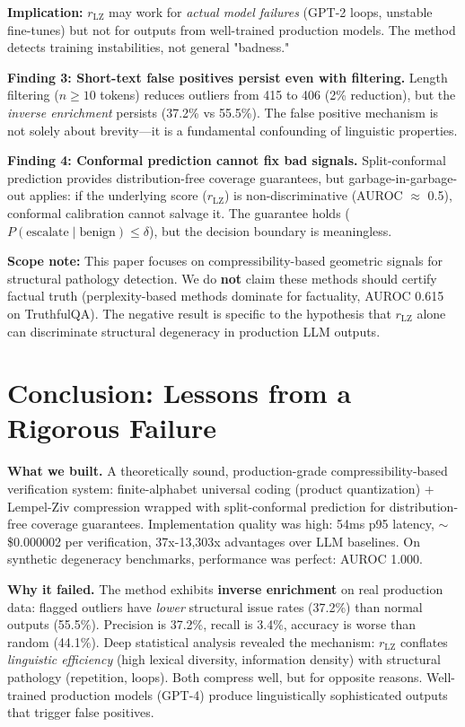 \documentclass[11pt]{article}
\begin{document}
\textbf{Implication:} $r_{\text{LZ}}$ may work for \textit{actual model failures} (GPT-2 loops, unstable fine-tunes) but not for outputs from well-trained production models. The method detects training instabilities, not general "badness."

\textbf{Finding 3: Short-text false positives persist even with filtering.} Length filtering ($n \geq 10$ tokens) reduces outliers from 415 to 406 (2\% reduction), but the \textit{inverse enrichment} persists (37.2\% vs 55.5\%). The false positive mechanism is not solely about brevity---it is a fundamental confounding of linguistic properties.

\textbf{Finding 4: Conformal prediction cannot fix bad signals.} Split-conformal prediction provides distribution-free coverage guarantees, but garbage-in-garbage-out applies: if the underlying score ($r_{\text{LZ}}$) is non-discriminative (AUROC $\approx$ 0.5), conformal calibration cannot salvage it. The guarantee holds ($P(\text{escalate} \mid \text{benign}) \leq \delta$), but the decision boundary is meaningless.

\textbf{Scope note:} This paper focuses on compressibility-based geometric signals for structural pathology detection. We do \textbf{not} claim these methods should certify factual truth (perplexity-based methods dominate for factuality, AUROC 0.615 on TruthfulQA). The negative result is specific to the hypothesis that $r_{\text{LZ}}$ alone can discriminate structural degeneracy in production LLM outputs.

\section{Conclusion: Lessons from a Rigorous Failure}
\label{sec:conclusion}

\textbf{What we built.} A theoretically sound, production-grade compressibility-based verification system: finite-alphabet universal coding (product quantization) + Lempel-Ziv compression wrapped with split-conformal prediction for distribution-free coverage guarantees. Implementation quality was high: 54ms p95 latency, $\sim$\$0.000002 per verification, 37x-13,303x advantages over LLM baselines. On synthetic degeneracy benchmarks, performance was perfect: AUROC 1.000.

\textbf{Why it failed.} The method exhibits \textbf{inverse enrichment} on real production data: flagged outliers have \textit{lower} structural issue rates (37.2\%) than normal outputs (55.5\%). Precision is 37.2\%, recall is 3.4\%, accuracy is worse than random (44.1\%). Deep statistical analysis revealed the mechanism: $r_{\text{LZ}}$ conflates \textit{linguistic efficiency} (high lexical diversity, information density) with structural pathology (repetition, loops). Both compress well, but for opposite reasons. Well-trained production models (GPT-4) produce linguistically sophisticated outputs that trigger false positives.
\end{document}
